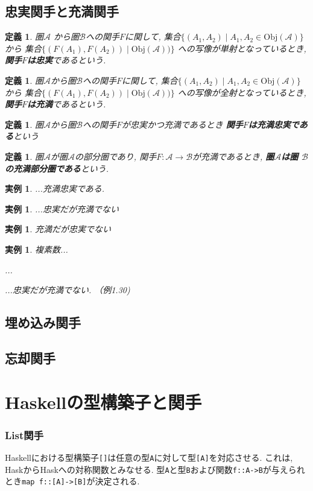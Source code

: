 \documentclass[dvipdfmx]{jsbook}
\theoremstyle{plain}
\newtheorem{Def}[thm]{定義}
\newtheorem{example}[thm]{実例}
\begin{document}
\subsection{忠実関手と充満関手}
\begin{Def}
圏$\mathscr{A}$
から圏$\mathscr{B}$への関手$F$に関して,
集合$\{(A_1,A_2)\mid A_1,A_2\in\mathrm{Obj}(\mathscr{A})\}$
から
集合$\{(F(A_1),F(A_2))\mid\mathrm{Obj}(\mathscr{A}))\}$
への写像が単射となっているとき,
{\bf 関手$F$は忠実}であるという.
\end{Def}
\begin{Def}
圏$\mathscr{A}$から圏$\mathscr{B}$への関手$F$に関して,
集合$\{(A_1,A_2)\mid A_1,A_2\in\mathrm{Obj}(\mathscr{A})\}$
から
集合$\{(F(A_1),F(A_2))\mid\mathrm{Obj}(\mathscr{A}))\}$
への写像が全射となっているとき,
{\bf 関手$F$は充満}であるという.
\end{Def}
\begin{Def}圏$\mathscr{A}$から圏$\mathscr{B}$への関手$F$が忠実かつ充満であるとき
{\bf 関手$F$は充満忠実である}という
\end{Def}
\begin{Def}
圏$\mathscr{A}$が圏$\mathscr{A}$の部分圏であり, 関手$F:\mathscr{A}\rightarrow\mathscr{B}$が充満であるとき,
{\bf 圏$\mathscr{A}$は圏 $\mathscr{B}$の充満部分圏である}という.
\end{Def}
\begin{example}
...充満忠実である.
\end{example}
\begin{example}
...忠実だが充満でない
\end{example}
\begin{example}
充満だが忠実でない
\end{example}
\begin{example}
複素数...

...

...忠実だが充満でない. （例1.30)
\end{example}
\subsection{埋め込み関手}
\subsection{忘却関手}
\section{Haskellの型構築子と関手}
\subsubsection{List関手}
Haskellにおける型構築子\verb|[]|は任意の型\verb|A|に対して型\verb|[A]|を対応させる.
これは, HaskからHaskへの対称関数とみなせる.
型\verb|A|と型\verb|B|および関数\verb|f::A->B|が与えられとき\verb|map f::[A]->[B]|が決定される.
\end{document}
